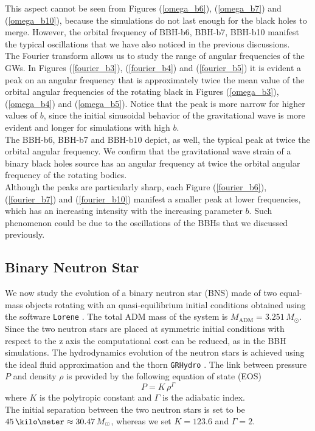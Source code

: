 This aspect cannot be seen from Figures (\ref{omega_b6}), (\ref{omega_b7}) and (\ref{omega_b10}), because the simulations do not last enough for the black holes to merge. 
However, the orbital frequency of BBH-b6, BBH-b7, BBH-b10 manifest the typical oscillations that we have also noticed in the previous discussions.\\
The Fourier transform allows us to study the range of angular frequencies of the GWs.
In Figures (\ref{fourier_b3}), (\ref{fourier_b4}) and (\ref{fourier_b5}) it is evident a peak on an angular frequency that is approximately twice the mean value of the orbital angular frequencies of the rotating black in Figures (\ref{omega_b3}), (\ref{omega_b4}) and (\ref{omega_b5}).
Notice that the peak is more narrow for higher values of $b$, since the initial sinusoidal behavior of the gravitational wave is more evident and longer for simulations with high $b$.\\
The BBH-b6, BBH-b7 and BBH-b10 depict, as well, the typical peak at twice the orbital angular frequency.
We confirm that the gravitational wave strain of a binary black holes source has an angular frequency at twice the orbital angular frequency of the rotating bodies.\\
Although the peaks are particularly sharp,  each Figure (\ref{fourier_b6}), (\ref{fourier_b7}) and (\ref{fourier_b10}) manifest a smaller peak at lower frequencies, which has an increasing intensity with the increasing parameter $b$.
Such phenomenon could be due to the oscillations of the BBHs that we discussed previously.

\pagebreak

\subsection{Binary Neutron Star}
We now study the evolution of a binary neutron star (BNS) made of two equal-mass objects rotating with an quasi-equilibrium initial conditions obtained using the software \texttt{Lorene} \cite{Lorene:web}.
The total ADM mass of the system is $M_{\text{ADM}} = 3.251 \, M_{\odot}$.
Since the two neutron stars are placed at symmetric initial conditions with respect to the z axis the computational cost can be reduced, as in the BBH simulations.
The hydrodynamics evolution of the neutron stars is achieved using the ideal fluid approximation and the thorn \texttt{GRHydro} \cite{moesta_grhydro:_2014}. 
The link between pressure $P$ and density $\rho$ is provided by the following equation of state (EOS)
\[
P = K \, \rho ^{\Gamma}
\]
where $K$ is the polytropic constant and $\Gamma$ is the adiabatic index.\\
The initial separation between the two neutron stars is set to be $45 \, \kilo \meter \approx 30.47 \, M_{\odot}$, whereas we set $K=123.6$ and $\Gamma=2$.\\

